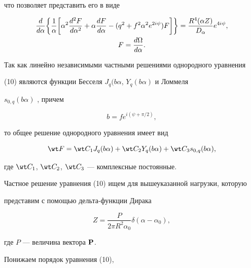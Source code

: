 \begin{pf}
что позволяет представить его в виде 


\begin{gather} 


\myfrac{}{}\bigg\{\frac{1}{\alpha}\bigg[\alpha^2 


\myfrac{^2F}{^2}+\alpha\myfrac{F}{}-(q^2+f^2\alpha^2 


e^{2i\psi})F\bigg]\bigg\}= 


\frac{R^4(\alpha Z)}{D_\alpha}e^{4i\psi},\notag\\ 


% 


F=\myfrac{\Omega}{}. 


\end{gather} 


Так как линейно независимыми частными решениями однородного уравнения 


(10) являются функции Бесселя $J_q(b\alpha$, $Y_q(b\alpha)$ и Ломмеля 


$s_{0,q}(b\alpha)$ \cite{3}, причем 


\begin{equation} 


b=f e^{i(\psi+\pi/2)}, 


\end{equation} 


то общее решение однородного уравнения имеет вид 


\begin{equation} 


\wt F=\wt C_1J_q(b\alpha)+\wt C_2Y_q(b\alpha)+ 


\wt C_3 s_{0,q}(b\alpha), 


\end{equation} 


где $\wt C_1$, $\wt C_2$, $\wt C_3$ --- комплексные постоянные. 


 


Частное решение уравнения (10) ищем для вышеуказанной нагрузки, которую 


представим с помощью дельта-функции Дирака


\begin{equation} 


Z=\frac{P}{2\pi R^2\alpha_0}\delta(\alpha-\alpha_0), 


\end{equation} 


где $P$ --- величина вектора $\bold P$. 


Понижаем порядок уравнения (10), 



\end{pf}
